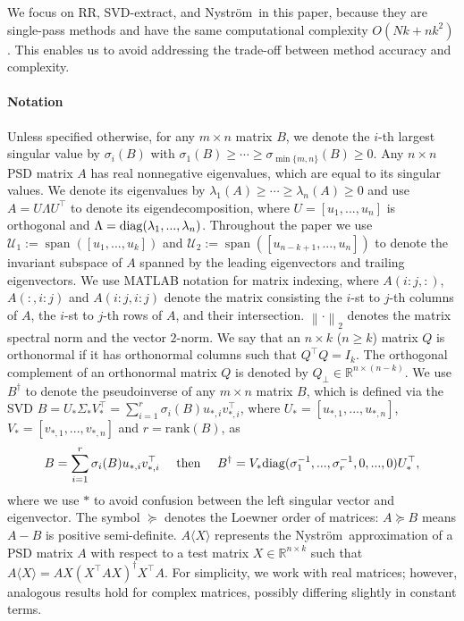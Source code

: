 \documentclass[onefignum,onetabnum]{siamart251216}
\def\Nystrom{Nystr{\"o}m}
\def\svdmethod{SVD-extract}
\def\leadingsubspace{\mathcal{U}_1}
\def\trailingsubspace{\mathcal{U}_2}
\newcommand{\image}{\operatorname{span}}
\newcommand{\diag}{{\rm diag}}
\begin{document}
We focus on RR, \svdmethod, and \Nystrom\ in this paper, because they are single-pass methods and have the same computational complexity $O(Nk+nk^2)$. This enables us to avoid addressing the trade-off between method accuracy and complexity. 

\paragraph{Notation}
Unless specified otherwise, for any $m \times n$ matrix $B$, we denote the $i$-th largest singular value by $\sigma_i(B)$ with $\sigma_1(B) \geq \cdots \geq \sigma_{\min\{m,n\}}(B) \geq 0$. Any $n \times n$ PSD matrix $A$ has real nonnegative eigenvalues, which are equal to its singular values. We denote its eigenvalues by $\lambda_{1}(A) \geq \cdots \geq \lambda_{n}(A) \geq 0$ and use $A = U \Lambda U^\top$ to denote its eigendecomposition, where $U =  \left[u_{1}, ..., u_{n}\right]$ is orthogonal and $\Lambda = \diag(\lambda_1, ..., \lambda_n)$. Throughout the paper we use $\leadingsubspace := \image([u_1, ..., u_k])$ and $\trailingsubspace := \image([u_{n-k+1}, ..., u_n])$ to denote the invariant subspace of $A$ spanned by the leading eigenvectors and trailing eigenvectors. We use MATLAB notation for matrix indexing, where $A(i:j, :)$, $A(:, i:j)$ and $A(i:j, i:j)$ denote the matrix consisting the $i$-st to $j$-th columns of $A$, the $i$-st to $j$-th rows of $A$, and their intersection. $\left\| \cdot \right\|_{2}$ denotes the matrix spectral norm and the vector $2$-norm. We say that an $n \times k$ ($n\geq k$) matrix $Q$ is orthonormal if it has orthonormal columns such that $Q^\top Q = I_{k}$. The orthogonal complement of an orthonormal matrix $Q$ is denoted by $Q_{\perp}\in\mathbb{R}^{n\times (n-k)}$. We use $B^{\dagger}$ to denote the pseudoinverse of any $m \times n$ matrix $B$, which is defined via the 
SVD $B=U_*\Sigma_*V_*^\top = \sum_{i=1}^{r}\sigma_{i}(B) u_{*,i}  v_{*,i}^\top $, where $U_{*} = \left[u_{*,1}, ..., u_{*,n}\right]$, $V_{*} = \left[v_{*,1}, ..., v_{*,n}\right]$ and $r=\mbox{rank}(B)$, as 
\[
    B = \sum_{i=1}^{r}\sigma_{i}(B)  u_{*,i}  v_{*,i}^\top \quad \text{ then }\quad B^{\dagger} = V_{*} \diag (\sigma_{1}^{-1}, ..., \sigma_{r}^{-1}, 0, ..., 0) U_{*}^\top,
\]
where we use $*$ to avoid confusion between the left singular vector and eigenvector. The symbol $\succeq$ denotes the Loewner order of matrices: $A \succeq B$ means $A-B$ is positive semi-definite. $A\langle X \rangle$ represents the \Nystrom\ approximation of a PSD matrix $A$ with respect to a test matrix $X\in\mathbb{R}^{n\times k}$ such that $A\langle X \rangle = AX (X^\top A X)^{\dagger} X^\top A$. For simplicity, we work with real matrices; however, analogous results hold for complex matrices, possibly differing slightly in constant terms.
\end{document}

